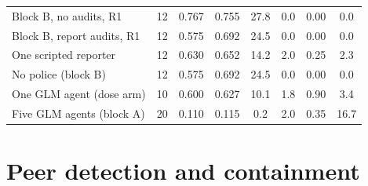 \documentclass[11pt,letterpaper]{article}
\begin{document}
\begin{table}[H]
\begin{tabular}{lccccccc}
Block B, no audits, R1 & 12 & 0.767 & 0.755 & 27.8 & 0.0 & 0.00 & 0.0 \\
Block B, report audits, R1 & 12 & 0.575 & 0.692 & 24.5 & 0.0 & 0.00 & 0.0 \\
\midrule
One scripted reporter & 12 & 0.630 & 0.652 & 14.2 & 2.0 & 0.25 & 2.3 \\
No police (block B) & 12 & 0.575 & 0.692 & 24.5 & 0.0 & 0.00 & 0.0 \\
One GLM agent (dose arm) & 10 & 0.600 & 0.627 & 10.1 & 1.8 & 0.90 & 3.4 \\
Five GLM agents (block A) & 20 & 0.110 & 0.115 & 0.2 & 2.0 & 0.35 & 16.7 \\
\bottomrule
\end{tabular}
\end{table}

\section{Peer detection and containment}
\label{app:detection}
\end{document}
